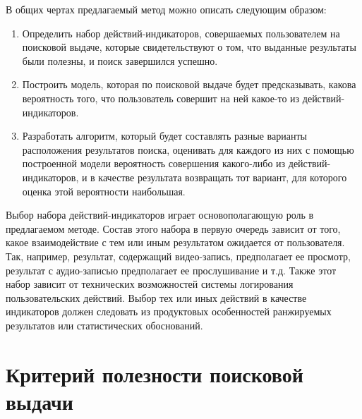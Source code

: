 \documentclass[12pt,a4paper]{report}
\begin{document}
В общих чертах предлагаемый метод можно описать следующим образом:
\begin{enumerate}[leftmargin=1.5\parindent]
\item Определить набор действий-индикаторов, совершаемых пользователем на поисковой выдаче, которые свидетельствуют о том, что выданные результаты были полезны, и поиск завершился успешно.
\item Построить модель, которая по поисковой выдаче будет предсказывать, какова вероятность того, что пользователь совершит на ней какое-то из действий-индикаторов.
\item Разработать алгоритм, который будет составлять разные варианты расположения результатов поиска, оценивать для каждого из них с помощью построенной модели вероятность совершения какого-либо из действий-индикаторов, и в качестве результата возвращать тот вариант, для которого оценка этой вероятности наибольшая.
\end{enumerate}

Выбор набора действий-индикаторов играет основополагающую роль в предлагаемом методе. Состав этого набора в первую очередь зависит от того, какое взаимодействие с тем или иным результатом ожидается от пользователя. Так, например, результат, содержащий видео-запись, предполагает ее просмотр, результат с аудио-записью предполагает ее прослушивание и т.д. Также этот набор зависит от технических возможностей системы логирования пользовательских действий. Выбор тех или иных действий в качестве индикаторов должен следовать из продуктовых особенностей ранжируемых результатов или статистических обоснований.



\section{Критерий полезности поисковой выдачи}
\label{sec:utility-criteria}
\end{document}
